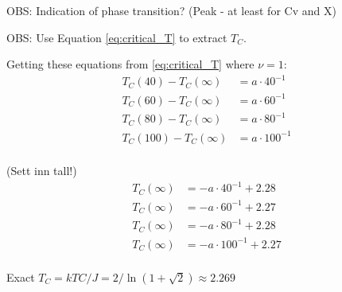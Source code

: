 OBS: Indication of phase transition? (Peak - at least for Cv and X)

OBS: Use Equation \ref{eq:critical_T} to extract $T_C$.

Getting these equations from \ref{eq:critical_T} where $\nu = 1$:
\begin{align*}
T_C(40) - T_C(\infty) &= a \cdot 40^{-1}\\
T_C(60) - T_C(\infty) &= a \cdot 60^{-1}\\
T_C(80) - T_C(\infty) &= a \cdot 80^{-1}\\
T_C(100) - T_C(\infty) &= a \cdot 100^{-1}\\
\end{align*}

(Sett inn tall!)
\begin{align*}
T_C(\infty) &= - a \cdot 40^{-1} + 2.28\\
T_C(\infty) &= - a \cdot 60^{-1} + 2.27\\
T_C(\infty) &= - a \cdot 80^{-1} + 2.28\\
T_C(\infty) &= - a \cdot 100^{-1} + 2.27\\
\end{align*}

Exact $T_C =  kTC/J = 2/ \ln(1+\sqrt{
2}) \approx 2.269$ \cite{Onsager}
